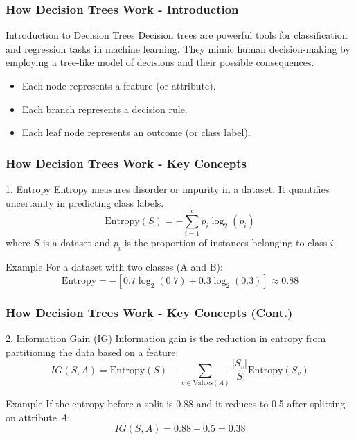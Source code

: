 \documentclass[aspectratio=169]{beamer}
\begin{document}
\begin{frame}[fragile]
    \frametitle{How Decision Trees Work - Introduction}
    \begin{block}{Introduction to Decision Trees}
        Decision trees are powerful tools for classification and regression tasks in machine learning. 
        They mimic human decision-making by employing a tree-like model of decisions and their possible consequences.
    \end{block}
    \begin{itemize}
        \item Each node represents a feature (or attribute).
        \item Each branch represents a decision rule.
        \item Each leaf node represents an outcome (or class label).
    \end{itemize}
\end{frame}

\begin{frame}[fragile]
    \frametitle{How Decision Trees Work - Key Concepts}
    \begin{block}{1. Entropy}
        Entropy measures disorder or impurity in a dataset. It quantifies uncertainty in predicting class labels.
        \begin{equation}
            \text{Entropy}(S) = -\sum_{i=1}^{c} p_i \log_2(p_i)
        \end{equation}
        where \( S \) is a dataset and \( p_i \) is the proportion of instances belonging to class \( i \).
    \end{block}
    \begin{block}{Example}
        For a dataset with two classes (A and B):
        \[
        \text{Entropy} = -[0.7 \log_2(0.7) + 0.3 \log_2(0.3)] \approx 0.88
        \]
    \end{block}
\end{frame}

\begin{frame}[fragile]
    \frametitle{How Decision Trees Work - Key Concepts (Cont.)}
    \begin{block}{2. Information Gain (IG)}
        Information gain is the reduction in entropy from partitioning the data based on a feature:
        \begin{equation}
            IG(S, A) = \text{Entropy}(S) - \sum_{v \in \text{Values}(A)} \frac{|S_v|}{|S|} \text{Entropy}(S_v)
        \end{equation}
    \end{block}
    \begin{block}{Example}
        If the entropy before a split is 0.88 and it reduces to 0.5 after splitting on attribute \( A \):
        \[
        IG(S, A) = 0.88 - 0.5 = 0.38
        \]
    \end{block}
\end{frame}
\end{document}
